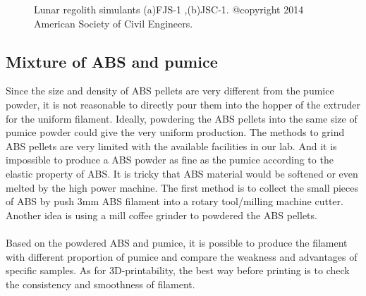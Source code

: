 \begin{figure}[htbp] %
	\centering

  \caption[SEM pictures of lunar regolith]{\footnotesize Lunar regolith simulants (a)FJS-1 ,(b)JSC-1. @copyright 2014 American Society of Civil Engineers.}
  \label{Fig:lunar}
\end{figure}
\subsection{Mixture of ABS and pumice}
Since the size and density of ABS pellets are very different from the pumice powder, it is not reasonable to directly pour them into the hopper of the extruder for the uniform filament. Ideally, powdering the ABS pellets into the same size of pumice powder could give the very uniform production. The methods to grind ABS pellets are very limited with the available facilities in our lab. And it is impossible to produce a ABS powder as fine as the pumice according to the elastic property of ABS. It is tricky that ABS material would be softened or even melted by the high power machine. The first method is to collect the small pieces of ABS by push 3mm ABS filament into a rotary tool/milling machine cutter. Another idea is using a mill coffee grinder to powdered the ABS pellets.\\
\\ 
Based on the powdered ABS and pumice, it is possible to produce the filament with different proportion of pumice and compare the weakness and advantages of specific samples. As for 3D-printability, the best way before printing is to check the consistency and smoothness of filament. 

